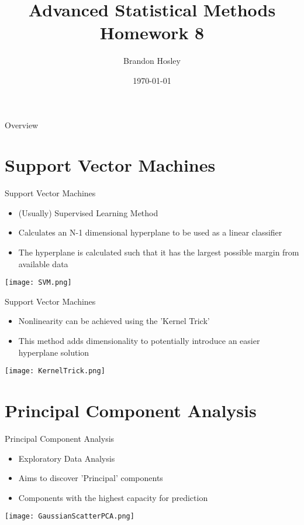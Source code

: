 \documentclass{beamer}
\title{Advanced Statistical Methods \\ Homework 8}
\author{Brandon Hosley}
\institute{University of Illinois - Springfield}
\date{\today}
\begin{document}
\frame{\titlepage}

\begin{frame}{Overview}
\tableofcontents
\end{frame}

\section[SVM]{Support Vector Machines}

\begin{frame}{Support Vector Machines}
	\begin{itemize}
		\item (Usually) Supervised Learning Method
		\item Calculates an N-1 dimensional hyperplane to be used as a linear classifier
		\item The hyperplane is calculated such that it has the largest possible margin from available data
	\end{itemize}
	\vspace{0.25em}
	\centering
	\texttt{[image: SVM.png]}
\end{frame}

\begin{frame}{Support Vector Machines}
\begin{itemize}
	\item Nonlinearity can be achieved using the 'Kernel Trick'
	\item This method adds dimensionality to potentially introduce an easier hyperplane solution
\end{itemize}
\vspace{0.25em}
\centering
\texttt{[image: KernelTrick.png]}
\end{frame}

\section[PCA]{Principal Component Analysis}

\begin{frame}{Principal Component Analysis}
	\begin{itemize}
		\item Exploratory Data Analysis
		\item Aims to discover 'Principal' components 
		\item[] Components with the highest capacity for prediction
	\end{itemize}
	\centering
	\texttt{[image: GaussianScatterPCA.png]}
\end{frame}
\end{document}
